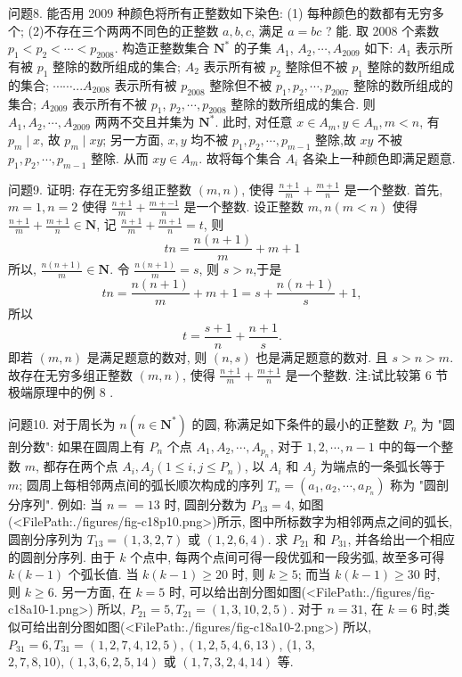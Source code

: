问题8. 能否用 2009 种颜色将所有正整数如下染色:
(1) 每种颜色的数都有无穷多个;
(2)不存在三个两两不同色的正整数 $a, b, c$, 满足 $a=b c$ ?
能.
取 2008 个素数 $p_1<p_2<\cdots<p_{2008}$. 构造正整数集合 $\mathbf{N}^*$ 的子集 $A_1$, $A_2, \cdots, A_{2009}$ 如下: $A_1$ 表示所有被 $p_1$ 整除的数所组成的集合; $A_2$ 表示所有被 $p_2$ 整除但不被 $p_1$ 整除的数所组成的集合; $\cdots \cdots . . . A_{2008}$ 表示所有被 $p_{2008}$ 整除但不被 $p_1, p_2, \cdots, p_{2007}$ 整除的数所组成的集合; $A_{2009}$ 表示所有不被 $p_1$, $p_2, \cdots, p_{2008}$ 整除的数所组成的集合.
则 $A_1, A_2, \cdots, A_{2009}$ 两两不交且并集为 $\mathbf{N}^*$.
此时, 对任意 $x \in A_m, y \in A_n, m<n$, 有 $p_m \mid x$, 故 $p_m \mid x y$; 另一方面, $x, y$ 均不被 $p_1, p_2, \cdots, p_{m-1}$ 整除,故 $x y$ 不被 $p_1, p_2, \cdots, p_{m-1}$ 整除.
从而 $x y \in A_m$.
故将每个集合 $A_i$ 各染上一种颜色即满足题意.



问题9. 证明: 存在无穷多组正整数 $(m, n)$, 使得 $\frac{n+1}{m}+\frac{m+1}{n}$ 是一个整数.
首先, $m=1, n=2$ 使得 $\frac{n+1}{m}+\frac{m+-1}{n}$ 是一个整数.
设正整数 $m, n(m<n)$ 使得 $\frac{n+1}{m}+\frac{m+1}{n} \in \mathbf{N}$, 记 $\frac{n+1}{m}+\frac{m+1}{n}=t$, 则
$$
t n=\frac{n(n+1)}{m}+m+1
$$
所以, $\frac{n(n+1)}{m} \in \mathbf{N}$. 令 $\frac{n(n+1)}{m}=s$, 则 $s>n$,于是
$$
t n=\frac{n(n+1)}{m}+m+1=s+\frac{n(n+1)}{s}+1,
$$
所以
$$
t=\frac{s+1}{n}+\frac{n+1}{s} .
$$
即若 $(m, n)$ 是满足题意的数对, 则 $(n, s)$ 也是满足题意的数对.
且 $s> n>m$.
故存在无穷多组正整数 $(m, n)$, 使得 $\frac{n+1}{m}+\frac{m+1}{n}$ 是一个整数.
注:试比较第 6 节极端原理中的例 8 .



问题10. 对于周长为 $n\left(n \in \mathbf{N}^*\right)$ 的圆, 称满足如下条件的最小的正整数 $P_n$ 为 "圆剖分数": 如果在圆周上有 $P_n$ 个点 $A_1, A_2, \cdots, A_{p_n}$, 对于 $1,2, \cdots, n-1$ 中的每一个整数 $m$, 都存在两个点 $A_i, A_j\left(1 \leqslant i, j \leqslant P_n\right)$, 以 $A_i$ 和 $A_j$ 为端点的一条弧长等于 $m$; 圆周上每相邻两点间的弧长顺次构成的序列 $T_n=\left(a_1, a_2, \cdots, a_{P_n}\right)$ 称为 "圆剖分序列". 例如: 当 $n==13$ 时, 圆剖分数为 $P_{13}=4$, 如图(<FilePath:./figures/fig-c18p10.png>)所示, 图中所标数字为相邻两点之间的弧长, 圆剖分序列为 $T_{13}=(1,3,2,7)$ 或 $(1,2,6,4)$.
求 $P_{21}$ 和 $P_{31}$, 并各给出一个相应的圆剖分序列.
由于 $k$ 个点中, 每两个点间可得一段优弧和一段劣弧, 故至多可得
$k(k-1)$ 个弧长值.
当 $k(k-1) \geqslant 20$ 时, 则 $k \geqslant 5$;
而当 $k(k-1) \geqslant 30$ 时, 则 $k \geqslant 6$.
另一方面, 在 $k=5$ 时, 可以给出剖分图如图(<FilePath:./figures/fig-c18a10-1.png>)
所以, $P_{21}=5, T_{21}=(1,3,10,2,5)$.
对于 $n=31$, 在 $k=6$ 时,类似可给出剖分图如图(<FilePath:./figures/fig-c18a10-2.png>)
所以, $P_{31}=6, T_{31}=(1,2,7,4,12,5),(1,2,5,4,6,13)$, (1, 3, $2,7,8,10),(1,3,6,2,5,14)$ 或 $(1,7,3,2,4,14)$ 等.




